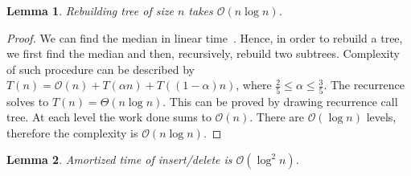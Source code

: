 \documentclass[10pt,a4paper]{article}
\newtheorem{lemma}{Lemma}
\newcommand{\Oh}{\mathcal{O}}
\begin{document}
\begin{lemma}\label{lem:1}
Rebuilding tree of size $n$ takes $\Oh(n \log n)$.
\end{lemma}

\begin{proof}
We can find the median in linear time~\cite{FIVE}. Hence, in order to rebuild a tree, we first find the median and then, recursively, rebuild two subtrees. Complexity of such procedure can be described by $T(n)=\Oh(n)+T(\alpha n)+T((1-\alpha)n)$, where $\frac{2}{5}\leq \alpha \leq \frac{3}{5}$. The recurrence solves to $T(n)=\Theta(n\log n)$. This can be proved by drawing recurrence call tree. At each level the work done sums to $\Oh(n)$. There are $\Oh(\log n)$ levels, therefore the complexity is $\Oh(n \log n)$.
\end{proof}

\begin{lemma}\label{lem:2}
Amortized time of insert/delete is $\Oh(\log^2 n)$.
\end{lemma}
\end{document}
